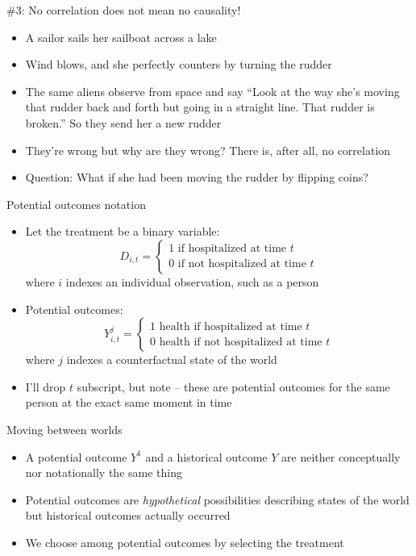 \documentclass{beamer}
\begin{document}


\begin{frame}{\#3: No correlation does not mean no causality!}

\begin{itemize}
	\item A sailor sails her sailboat across a lake
	\item Wind blows, and she perfectly counters by turning the rudder
	\item The same aliens observe from space and say ``Look at the way she's moving that rudder back and forth but going in a straight line.  That rudder is broken.'' So they send her a new rudder
	\item They're wrong but why are they wrong? There is, after all, no correlation
	\item Question: What if she had been moving the rudder by flipping coins?
\end{itemize}

\end{frame}



\begin{frame}{Potential outcomes notation}
	
	\begin{itemize}
	\item Let the treatment be a binary variable: $$D_{i,t} =\begin{cases} 1 \text{ if hospitalized at time $t$} \\ 0 \text{ if not hospitalized at time $t$} \end{cases}$$where $i$ indexes an individual observation, such as a person

	\item Potential outcomes: $$Y_{i,t}^j =\begin{cases} 1 \text{ health if hospitalized at time $t$} \\ 0 \text{ health if not hospitalized at time $t$} \end{cases}$$where $j$ indexes a counterfactual state of the world

	\item I'll drop $t$ subscript, but note -- these are potential outcomes for the same person at the exact same moment in time
	\end{itemize}
\end{frame}

\begin{frame}{Moving between worlds}

\begin{itemize}
\item A potential outcome $Y^1$ and a historical outcome $Y$ are neither conceptually nor notationally the same thing
\item Potential outcomes are \emph{hypothetical} possibilities describing states of the world but historical outcomes actually occurred
\item We choose among potential outcomes by selecting the treatment
\end{itemize}
\end{frame}
\end{document}
